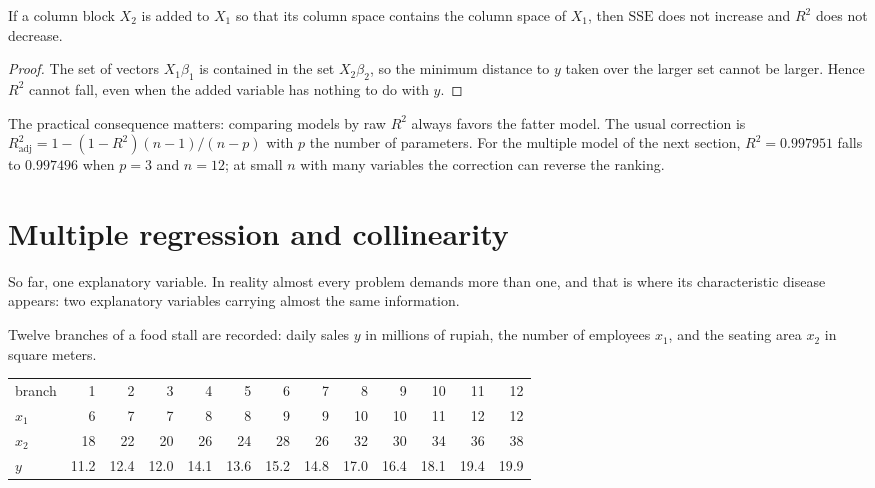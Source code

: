 \begin{proposisi}
If a column block $X_2$ is added to $X_1$ so that its column space contains the column space of
$X_1$, then $\mathrm{SSE}$ does not increase and $R^2$ does not decrease.
\end{proposisi}

\begin{proof}[Proof]
The set of vectors $X_1\beta_1$ is contained in the set $X_2\beta_2$, so the minimum distance to
$y$ taken over the larger set cannot be larger. Hence $R^2$ cannot fall, even when the added
variable has nothing to do with $y$.
\end{proof}

The practical consequence matters: comparing models by raw $R^2$ always favors the fatter model.
The usual correction is $R^2_{\text{adj}}=1-(1-R^2)(n-1)/(n-p)$ with $p$ the number of
parameters. For the multiple model of the next section, $R^2=0.997951$ falls to $0.997496$ when
$p=3$ and $n=12$; at small $n$ with many variables the correction can reverse the ranking.

\section{Multiple regression and collinearity}

So far, one explanatory variable. In reality almost every problem demands more than one, and
that is where its characteristic disease appears: two explanatory variables carrying almost the
same information.

Twelve branches of a food stall are recorded: daily sales $y$ in millions of rupiah, the number
of employees $x_1$, and the seating area $x_2$ in square meters.

\begin{center}
\small
\begin{tabular}{l*{12}{r}}
\hline
branch   & 1 & 2 & 3 & 4 & 5 & 6 & 7 & 8 & 9 & 10 & 11 & 12 \\
$x_1$    & 6 & 7 & 7 & 8 & 8 & 9 & 9 & 10 & 10 & 11 & 12 & 12 \\
$x_2$    & 18 & 22 & 20 & 26 & 24 & 28 & 26 & 32 & 30 & 34 & 36 & 38 \\
$y$      & 11.2 & 12.4 & 12.0 & 14.1 & 13.6 & 15.2 & 14.8 & 17.0 & 16.4 & 18.1 & 19.4 & 19.9 \\
\hline
\end{tabular}
\end{center}

